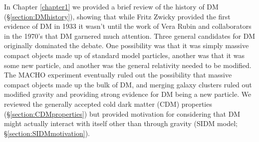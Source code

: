 In Chapter \ref{chapter1} we provided a brief review of the history of DM (\S\ref{section:DMhistory}), showing that while Fritz Zwicky provided the first evidence of DM in 1933 \citep{Zwicky:1933ub} it wasn't until the work of Vera Rubin and collaborators \citep{Rubin:1970gu} in the 1970's that DM garnered much attention.
Three general candidates for DM originally dominated the debate.
One possibility was that it was simply massive compact objects made up of standard model particles, another was that it was some new particle, and another was the general relativity needed to be modified.
The MACHO experiment \citep{Alcock:2000bw} eventually ruled out the possibility that massive compact objects made up the bulk of DM, and merging galaxy clusters ruled out modified gravity \citep{Clowe:2006hr} and providing strong evidence for DM being a new particle.
We reviewed the generally accepted cold dark matter (CDM) properties (\S\ref{section:CDMproperties}) but provided motivation for considering that DM might actually interact with itself other than through gravity (SIDM model; \S\ref{section:SIDMmotivation}).
